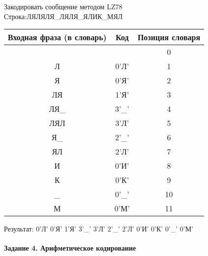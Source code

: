 \documentclass[a4paper, 12pt]{article}
\begin{document}
Закодировать сообщение методом LZ78\\
Строка:ЛЯЛЯЛЯ\_ЛЯЛЯ\_ЯЛИК\_МЯЛ\\
\begin{table}[h!]
\centering
\begin{tabular}{|c|c|c|} 
\hline
 Входная фраза (в словарь) & Код & Позиция словаря \\ \hline

 &  & 0 \\ \hline
Л & 0'Л' & 1 \\ \hline
Я & 0'Я' & 2 \\ \hline
ЛЯ & 1'Я' & 3 \\ \hline
ЛЯ\_ & 3'\_' & 4 \\ \hline
ЛЯЛ & 3'Л' & 5 \\ \hline
Я\_ & 2'\_' & 6 \\ \hline
ЯЛ & 2'Л' & 7 \\ \hline
И & 0'И' & 8 \\ \hline
К & 0'К' & 9 \\ \hline
\_ & 0'\_' & 10 \\ \hline
М & 0'М' & 11 \\ \hline
\end{tabular}
\end{table}

Результат: 0'Л' 0'Я' 1'Я' 3'\_' 3'Л' 2'\_' 2'Л' 0'И' 0'К' 0'\_' 0'М'\\
\pagebreak
\paragraph{Задание 4. Арифметическое кодирование\\}
\end{document}
